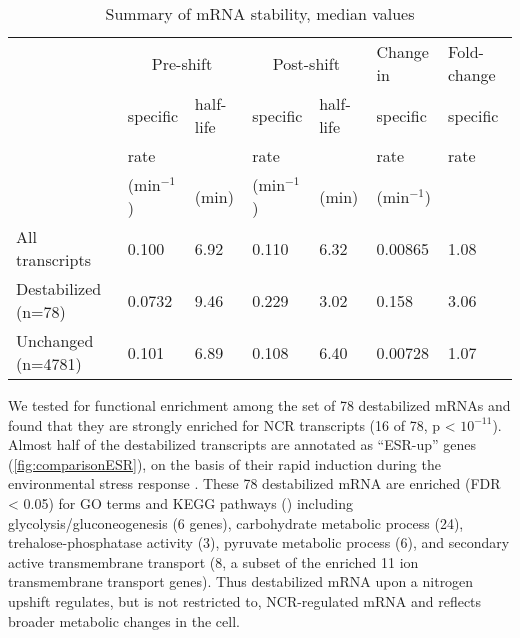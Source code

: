\begin{table}[h]
\small
\caption{\label{tab:table1} Summary of mRNA stability, median values}
\begin{tabular}{p{8em} | l | l | l | l | l | l}
& \multicolumn{2}{c}{Pre-shift} & \multicolumn{2}{c}{Post-shift} &
Change in & Fold-change\\
 & specific & half-life & specific  & half-life & specific & specific \\
 & rate & & rate & & rate & rate \\
 & (min$^{-1}$) & (min) & (min$^{-1}$) & (min) & (min$^{-1}$) & \\
\midrule
\raggedright All transcripts & 0.100 & 6.92 & 0.110 & 6.32 & 0.00865 & 1.08\\
\midrule
\raggedright Destabilized (n=78) & 0.0732 & 9.46 & 0.229 & 3.02 & 0.158 & 3.06\\
\midrule
\raggedright Unchanged (n=4781) & 0.101 & 6.89 & 0.108 & 6.40 & 0.00728 & 1.07\\
\bottomrule
\end{tabular}
\end{table}


We tested for
functional enrichment among the set of 78 destabilized
mRNAs and found that they are strongly enriched for NCR
transcripts (16 of 78, p < $10^{-11}$). Almost half of the
destabilized transcripts are annotated as “ESR-up” genes
(\autoref{fig:comparisonESR}), on the basis of  their rapid induction
during the environmental stress response \parencite{gasch2000genomic}. These 78
destabilized mRNA are enriched (FDR < 0.05) for GO terms and KEGG 
pathways () including
glycolysis/gluconeogenesis (6 genes), 
carbohydrate metabolic process (24),
trehalose-phosphatase activity (3), 
pyruvate metabolic process (6), 
and secondary active transmembrane transport
(8, a subset of the enriched 11 ion transmembrane transport genes).
Thus destabilized mRNA upon a nitrogen upshift regulates, 
but is not restricted to, NCR-regulated mRNA and reflects broader
metabolic changes in the cell. 

